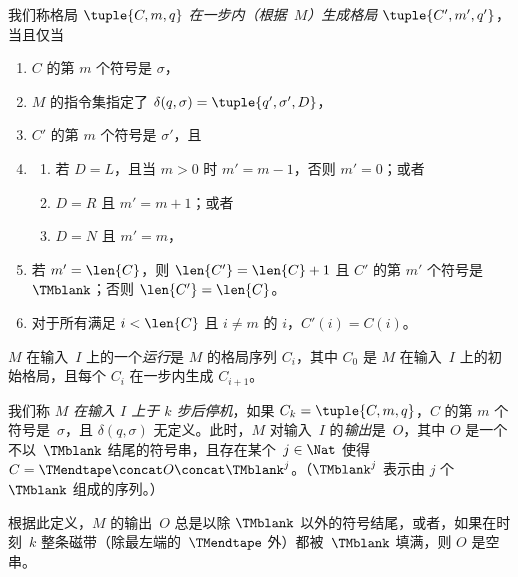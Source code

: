 \documentclass[../../../include/open-logic-section]{subfiles}
\begin{document}
\begin{defn}
我们称格局 $\tuple{C, m, q}$ \emph{在一步内（根据~$M$）生成格局 $\tuple{C', m', q'}$}，
当且仅当
\begin{enumerate}
\item $C$ 的第 $m$ 个符号是 $\sigma$，
\item $M$ 的指令集指定了 $\delta(q, \sigma) =
  \tuple{q', \sigma', D}$，
\item $C'$ 的第 $m$ 个符号是 $\sigma'$，且
\item
\begin{enumerate}
\item 若 $D = L$，且当 $m>0$ 时 $m' = m - 1$，否则 $m'=0$；或者
\item $D = R$ 且 $m' = m + 1$；或者
\item $D = N$ 且 $m' = m$，
\end{enumerate}
\item 若 $m' = \len{C}$，则 $\len{C'} = \len{C} + 1$ 且 $C'$ 的第 $m'$ 个符号是~$\TMblank$；否则 $\len{C'}=\len{C}$。
\item 对于所有满足 $i < \len{C}$ 且 $i \neq m$ 的 $i$，$C'(i) = C(i)$。
\end{enumerate}
\end{defn}

\begin{defn}
$M$ 在输入~$I$ 上的一个\emph{运行}是 $M$ 的格局序列 $C_i$，其中 $C_0$ 是 $M$ 在输入~$I$ 上的初始格局，且每个 $C_i$ 在一步内生成 $C_{i+1}$。

我们称 $M$ \emph{在输入 $I$ 上于 $k$ 步后停机}，如果 $C_k =
\tuple{C, m, q}$，$C$ 的第 $m$ 个符号是~$\sigma$，且 $\delta(q,
\sigma)$ 无定义。此时，$M$ 对输入~$I$ 的\emph{输出}是~$O$，其中 $O$ 是一个不以~$\TMblank$ 结尾的符号串，且存在某个~$j \in \Nat$ 使得 $C = \TMendtape \concat O \concat \TMblank^j$。（$\TMblank^j$ 表示由 $j$ 个 $\TMblank$ 组成的序列。）
\end{defn}

\begin{explain}
根据此定义，$M$ 的输出~$O$ 总是以除 $\TMblank$ 以外的符号结尾，或者，如果在时刻~$k$ 整条磁带（除最左端的~$\TMendtape$ 外）都被~$\TMblank$ 填满，则 $O$ 是空串。
\end{explain}
\end{document}
